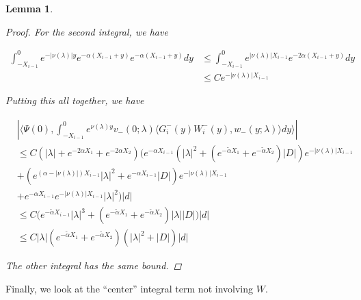 \documentclass[12pt]{article}
\newtheorem{lemma}{Lemma}
\begin{document}
\begin{lemma}
\begin{proof}
For the second integral, we have

\begin{align*}
\int_{-X_{i-1}}^0 e^{-|\nu(\lambda)|y} e^{-\alpha(X_{i-1} + y)} e^{-\alpha(X_{i-1} + y)} dy &\leq \int_{-X_{i-1}}^0 e^{|\nu(\lambda)|X_{i-1}} e^{-2\alpha(X_{i-1} + y)}  dy \\
&\leq C e^{-|\nu(\lambda)|X_{i-1}}
\end{align*}

Putting this all together, we have

\begin{align*}
&\left| \langle \Psi(0), \int_{-X_{i-1}}^0
e^{\nu(\lambda)y} v_-(0; \lambda) \langle G_i^-(y)W_i^-(y), w_-(y; \lambda) \rangle dy \rangle \right| \\
&\leq C (|\lambda| + e^{-2 \alpha X_1} + e^{-2 \alpha X_2}) \Big( e^{-\alpha X_{i-1}} (|\lambda|^2 + (e^{-\tilde{\alpha} X_1} + e^{-\tilde{\alpha} X_2} ) |D|)e^{-|\nu(\lambda)|X_{i-1}} \\
&+ (e^{(\alpha - |\nu(\lambda)|) X_{i-1}} |\lambda|^2 + e^{-\alpha X_{i-1}} |D|)e^{-|\nu(\lambda)|X_{i-1}} \\
&+ e^{-\alpha X_{i-1}} e^{-|\nu(\lambda)|X_{i-1}} |\lambda|^2 \Big) |d| \\
&\leq C \Big( e^{-\tilde{\alpha} X_{i-1}} |\lambda|^3 + (e^{-\tilde{\alpha} X_1} + e^{-\tilde{\alpha} X_2} )|\lambda| |D| \Big) |d| \\
&\leq C |\lambda| (e^{-\tilde{\alpha} X_1} + e^{-\tilde{\alpha} X_2}) (|\lambda|^2 + |D| ) |d|
\end{align*}

The other integral has the same bound.

\end{proof}
\end{lemma}


Finally, we look at the ``center'' integral term not involving $W$.
\end{document}

